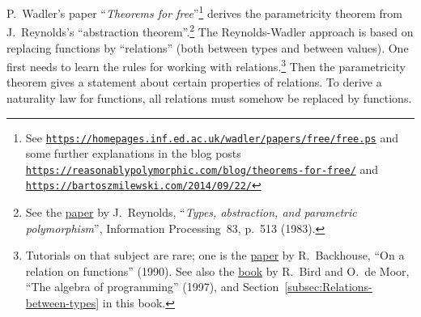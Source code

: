 \noindent {}P.~Wadler\textsf{'}s paper \textsf{``}\emph{Theorems
for free}\textsf{''}\footnote{See \texttt{\href{https://homepages.inf.ed.ac.uk/wadler/papers/free/free.ps}{https://homepages.inf.ed.ac.uk/wadler/papers/free/free.ps}}
and some further explanations in the blog posts \texttt{\href{https://reasonablypolymorphic.com/blog/theorems-for-free/}{https://reasonablypolymorphic.com/blog/theorems-for-free/}}
and \texttt{\href{https://bartoszmilewski.com/2014/09/22/}{https://bartoszmilewski.com/2014/09/22/}}} derives the parametricity theorem from J.~Reynolds\textsf{'}s \textsf{``}abstraction
theorem\textsf{''}.\footnote{See the \href{https://people.mpi-sws.org/~dreyer/tor/papers/reynolds.pdf}{paper}
by J.~Reynolds, \textsf{``}\emph{Types, abstraction, and parametric polymorphism}\textsf{''},
Information Processing~83, p.~513 (1983).} The Reynolds-Wadler approach is based on replacing functions by \textsf{``}relations\textsf{''}
(both between types and between values). One first needs to learn
the rules for working with relations.\footnote{Tutorials on that subject are rare; one is the \href{https://www.researchgate.net/publication/262348393_On_a_Relation_on_Functions}{paper}
by R.~Backhouse, \textsf{``}On a relation on functions\textsf{''}
(1990). See also the \href{https://themattchan.com/docs/algprog.pdf}{book}
by R.~Bird and O.~de Moor, \textsf{``}The algebra of
programming\textsf{''} (1997), and Section~\ref{subsec:Relations-between-types}
in this book.} Then the parametricity theorem gives a statement about certain properties
of relations. To derive a naturality law for functions, all relations
must somehow be replaced by functions. 

